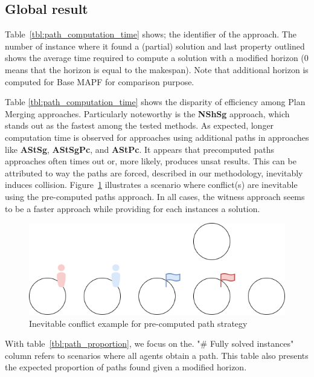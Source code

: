\subsection{Global result}

 Table~\ref{tbl:path_computation_time} shows; the identifier of the approach. The number of instance where it found a (partial) solution and last property outlined shows the average time required to compute a solution with a modified horizon (0 means that the horizon is equal to the makespan). Note that additional horizon is computed for Base MAPF for comparison purpose.




 Table \ref{tbl:path_computation_time} shows the disparity of efficiency among Plan Merging approaches. Particularly noteworthy is the \textbf{NShSg} approach, which stands out as the fastest among the tested methods. As expected, longer computation time is observed for approaches using additional paths in approaches like \textbf{AStSg}, \textbf{AStSgPc}, and \textbf{AStPc}.
It appears that precomputed paths approaches often times out or, more likely, produces unsat results. This can be attributed to way the paths are forced, described in our methodology, inevitably induces collision. Figure~\ref{fig:precomputed_path_conflict} illustrates a scenario where conflict(s) are inevitable using the pre-computed paths approach.
In all cases, the witness approach seems to be a faster approach while providing for each instances a solution.
\begin{figure}[H]
    \centering
    \caption{Inevitable conflict example for pre-computed path strategy}\label{fig:precomputed_path_conflict}
    \includegraphics[width=\widthimg]{img/precomputed_path_conflict.drawio.png}
\end{figure}


With table~\ref{tbl:path_proportion}, we focus on the. "\# Fully solved instances" column refers to scenarios where all agents obtain a path. This table also presents the expected proportion of paths found given a modified horizon.

